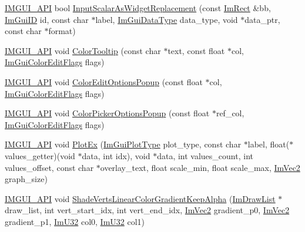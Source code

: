 \begin{DoxyCompactItemize}
\item 
\mbox{\hyperlink{imgui_8h_a43829975e84e45d1149597467a14bbf5}{I\+M\+G\+U\+I\+\_\+\+A\+PI}} bool \mbox{\hyperlink{namespace_im_gui_ad724ab94c8aff2440c6a1b58ae7b2334}{Input\+Scalar\+As\+Widget\+Replacement}} (const \mbox{\hyperlink{struct_im_rect}{Im\+Rect}} \&bb, \mbox{\hyperlink{imgui_8h_a1785c9b6f4e16406764a85f32582236f}{Im\+Gui\+ID}} id, const char $\ast$label, \mbox{\hyperlink{imgui_8h_a4cfa8697a3d76722fff83eb18922e9d5}{Im\+Gui\+Data\+Type}} data\+\_\+type, void $\ast$data\+\_\+ptr, const char $\ast$format)
\item 
\mbox{\hyperlink{imgui_8h_a43829975e84e45d1149597467a14bbf5}{I\+M\+G\+U\+I\+\_\+\+A\+PI}} void \mbox{\hyperlink{namespace_im_gui_afad90b366b6471e3b13175c0ebeb26c8}{Color\+Tooltip}} (const char $\ast$text, const float $\ast$col, \mbox{\hyperlink{imgui_8h_a6b2d5e95adc38f22c021252189f669c6}{Im\+Gui\+Color\+Edit\+Flags}} flags)
\item 
\mbox{\hyperlink{imgui_8h_a43829975e84e45d1149597467a14bbf5}{I\+M\+G\+U\+I\+\_\+\+A\+PI}} void \mbox{\hyperlink{namespace_im_gui_a6bfb117816d669f8704e5d0c0c0795fe}{Color\+Edit\+Options\+Popup}} (const float $\ast$col, \mbox{\hyperlink{imgui_8h_a6b2d5e95adc38f22c021252189f669c6}{Im\+Gui\+Color\+Edit\+Flags}} flags)
\item 
\mbox{\hyperlink{imgui_8h_a43829975e84e45d1149597467a14bbf5}{I\+M\+G\+U\+I\+\_\+\+A\+PI}} void \mbox{\hyperlink{namespace_im_gui_a6d112eeb6d8ffdebbc9d9a8c66babbee}{Color\+Picker\+Options\+Popup}} (const float $\ast$ref\+\_\+col, \mbox{\hyperlink{imgui_8h_a6b2d5e95adc38f22c021252189f669c6}{Im\+Gui\+Color\+Edit\+Flags}} flags)
\item 
\mbox{\hyperlink{imgui_8h_a43829975e84e45d1149597467a14bbf5}{I\+M\+G\+U\+I\+\_\+\+A\+PI}} void \mbox{\hyperlink{namespace_im_gui_a0a18ae07b294d5667f95a5c003d2efb6}{Plot\+Ex}} (\mbox{\hyperlink{imgui__internal_8h_a9d5efcdd8895aa3544f1e8ce366c2728}{Im\+Gui\+Plot\+Type}} plot\+\_\+type, const char $\ast$label, float($\ast$values\+\_\+getter)(void $\ast$data, int idx), void $\ast$data, int values\+\_\+count, int values\+\_\+offset, const char $\ast$overlay\+\_\+text, float scale\+\_\+min, float scale\+\_\+max, \mbox{\hyperlink{struct_im_vec2}{Im\+Vec2}} graph\+\_\+size)
\item 
\mbox{\hyperlink{imgui_8h_a43829975e84e45d1149597467a14bbf5}{I\+M\+G\+U\+I\+\_\+\+A\+PI}} void \mbox{\hyperlink{namespace_im_gui_acd137f6ee31f657e539eaa7e62f4f28a}{Shade\+Verts\+Linear\+Color\+Gradient\+Keep\+Alpha}} (\mbox{\hyperlink{struct_im_draw_list}{Im\+Draw\+List}} $\ast$draw\+\_\+list, int vert\+\_\+start\+\_\+idx, int vert\+\_\+end\+\_\+idx, \mbox{\hyperlink{struct_im_vec2}{Im\+Vec2}} gradient\+\_\+p0, \mbox{\hyperlink{struct_im_vec2}{Im\+Vec2}} gradient\+\_\+p1, \mbox{\hyperlink{imgui_8h_a118cff4eeb8d00e7d07ce3d6460eed36}{Im\+U32}} col0, \mbox{\hyperlink{imgui_8h_a118cff4eeb8d00e7d07ce3d6460eed36}{Im\+U32}} col1)

\end{DoxyCompactItemize}
